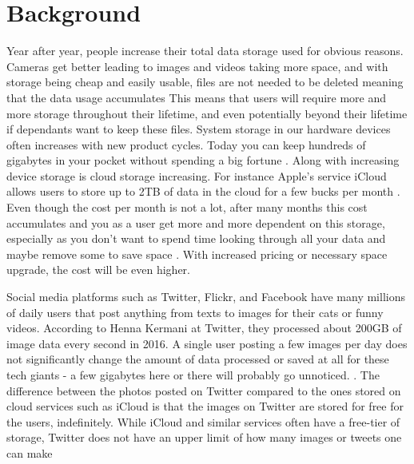 \section{Background}
\label{sec:background}


Year after year, people increase their total data storage used for obvious reasons. Cameras get better leading to images and videos taking more space, and with storage being cheap and easily usable, files are not needed to be deleted meaning that the data usage accumulates %
This means that users will require more and more storage throughout their lifetime, and even potentially beyond their lifetime if dependants want to keep these files. System storage in our hardware devices often increases with new product cycles. Today you can keep hundreds of gigabytes in your pocket without spending a big fortune%
. Along with increasing device storage is cloud storage increasing. For instance Apple's service iCloud allows users to store up to 2TB of data in the cloud for a few bucks per month %
. Even though the cost per month is not a lot, after many months this cost accumulates and you as a user get more and more dependent on this storage, especially as you don't want to spend time looking through all your data and maybe remove some to save space %
. With increased pricing or necessary space upgrade, the cost will be even higher.

Social media platforms such as Twitter, Flickr, and Facebook have many millions of daily users that post anything from texts to images for their cats or funny videos. According to Henna Kermani at Twitter, they processed about 200GB of image data every second in 2016\cite{MobileScaleLondona}. A single user posting a few images per day does not significantly change the amount of data processed or saved at all for these tech giants - a few gigabytes here or there will probably go unnoticed. %
. The difference between the photos posted on Twitter compared to the ones stored on cloud services such as iCloud is that the images on Twitter are stored for free for the users, indefinitely. While iCloud and similar services often have a free-tier of storage, Twitter does not have an upper limit of how many images or tweets one can make %